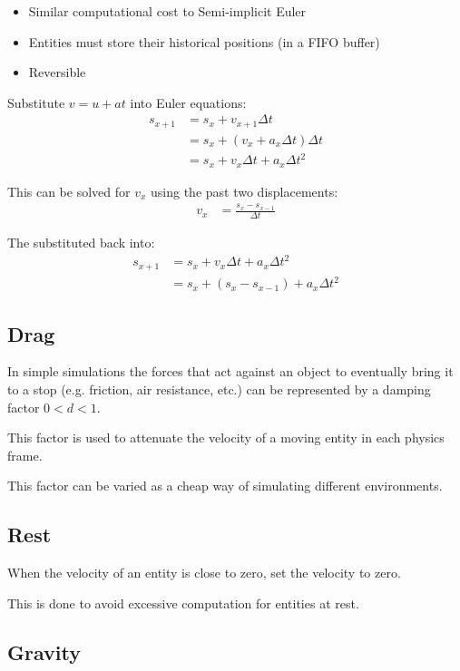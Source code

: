 \documentclass[a4paper]{article}
\begin{document}
\begin{itemize}
  \item Similar computational cost to Semi-implicit Euler
  \item Entities must store their historical positions (in a FIFO buffer)
  \item Reversible
\end{itemize}

Substitute $v = u + at$ into Euler equations:
\begin{align*}
  s_{x + 1} &= s_{x} + v_{x + 1} \Delta t \\
            &= s_{x} + (v_{x} + a_{x} \Delta t) \Delta t \\
            &= s_{x} + v_{x} \Delta t + a_{x} \Delta t^{2}
\end{align*}

This can be solved for $v_{x}$ using the past two displacements:
\begin{align*}
  v_{x} &= \frac{s_{x} - s_{x - 1}}{\Delta t}
\end{align*}

The substituted back into:
\begin{align*}
  s_{x + 1} &= s_{x} + v_{x} \Delta t + a_{x} \Delta t^{2} \\
            &= s_{x} + (s_{x} - s_{x - 1}) + a_{x} \Delta t^{2}
\end{align*}

\subsection{Drag}

In simple simulations the forces that act against an object to eventually bring
it to a stop (e.g. friction, air resistance, etc.) can be represented by a
damping factor $0 < d < 1$.

This factor is used to attenuate the velocity of a moving entity in each physics
frame.

This factor can be varied as a cheap way of simulating different environments.

\subsection{Rest}

When the velocity of an entity is close to zero, set the velocity to zero.

This is done to avoid excessive computation for entities at rest.

\subsection{Gravity}
\end{document}
